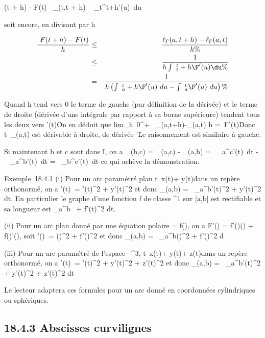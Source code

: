 \documentclass[]{article}
\begin{document}
\F(t + h) - F(t)\ \leq
\ell_\Gamma(t,t + h) \leq\int ~
_t^t+h\F'(u)\
du

soit encore, en divisant par h

\begin{align*} \ F(t + h)
- F(t) \over h & \leq&
\ell_\Gamma(a,t + h) - \ell_\Gamma(a,t) \over h \%&
\\ & \leq& 1 \over h
\int ~
_t^t+h\F'(u)\du
\%& \\ & =& 1 \over
h \left (\int ~
_a^t+h\F'(u)\
du -\int ~
_a^t\F'(u)\
du\right )\%& \\
\end{align*}

Quand h tend vers 0 le terme de gauche (par définition de la dérivée) et
le terme de droite (dérivée d'une intégrale par rapport à sa borne
supérieure) tendent tous les deux vers
\F'(t)\. On en déduit
que lim_h\rightarrow~0^+~
\ell_\Gamma(a,t+h)-\ell_\Gamma(a,t) \over h
='(t)\. Donc
t\mapsto~\ell_\Gamma(a,t) est dérivable à droite,
de dérivée \F'\. Le
raisonnement est similaire à gauche.

Si maintenant b et c sont dans I, on a \ell_\Gamma(b,c) =
\ell_\Gamma(a,c) - \ell_\Gamma(a,b) =\int ~
_a^c\F'(t)\
dt -\int ~
_a^b\F'(t)\
dt =\int ~
_b^c\F'(t)\
dt ce qui achève la démonstration.

Exemple~18.4.1 (i) Pour un arc paramétré plan
t\mapsto~x(t)\vec\imath +
y(t)\vecȷ dans un repère orthonormé, on a
\F'(t)\ =
\sqrtx'(t)^2  + y'(t)^2 et donc
\ell_\Gamma(a,b) =\int ~
_a^b\sqrtx'(t)^2  +
y'(t)^2 dt. En particulier le graphe d'une fonction f de
classe \mathcal{C}^1 sur [a,b] est rectifiable et sa longueur est
\int  _a^b~
+ f'(t)^2 dt.

(ii) Pour un arc plan donné par une équation polaire \rho = f(\theta), on a
F'(\theta) = f'(\theta)\vecu(\theta) +
f(\theta)\vecu'(\theta), soit
\F'(\theta)\ =
\sqrtf(\theta)^2  + f'(\theta)^2 et donc
\ell_\Gamma(a,b) =\int ~
_a^b\sqrtf(\theta)^2  +
f'(\theta)^2 d\theta

(iii) Pour un arc paramétré de l'espace ~^3,
t\mapsto~x(t)\vec\imath +
y(t)\vecȷ + z(t)\veck dans un
repère orthonormé, on a
\F'(t)\ =
\sqrtx'(t)^2  + y'(t)^2  +
z'(t)^2 et donc \ell_\Gamma(a,b)
=\int ~
_a^b\sqrtx'(t)^2  +
y'(t)^2  + z'(t)^2 dt

Le lecteur adaptera ces formules pour un arc donné en coordonnées
cylindriques ou sphériques.

\subsection{18.4.3 Abscisses curvilignes}
\end{document}
